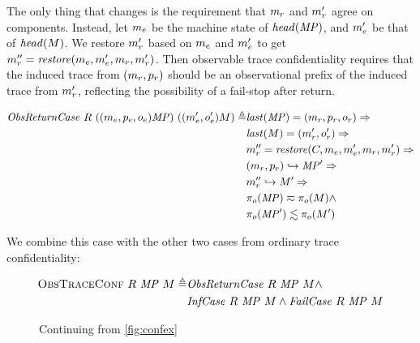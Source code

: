 \documentclass[acmsmall,review,anonymous]{acmart}\settopmatter{printfolios=true,printccs=false,printacmref=false}
\begin{document}
{{      The only thing that changes is the requirement that \(m_r\)
      and \(m_r'\) agree on components. Instead, let \(m_e\)
      be the machine state of \(\mathit{head}(\mathit{MP})\), and \(m_e'\) be
      that of \(\mathit{head}(M)\). We restore \(m_r'\) based on
      \(m_e\) and \(m_e'\) to get \(m_r'' =
      \mathit{restore}(m_e,m_e',m_r,m_r')\).  Then
      observable trace confidentiality requires that the
      induced trace from \((m_r,p_r)\) should be an
      observational prefix of the induced trace from \(m_r'\),
      reflecting the possibility of a fail-stop after return.

      \[\begin{split}
        \mathit{ObsReturnCase} ~ R ~ ((m_e,p_e,o_e)\mathit{MP}) ~ ((m_e',o_e')M) \triangleq
        & \mathit{last}(\mathit{MP}) = (m_r,p_r,o_r) \Rightarrow \\
        & \mathit{last}(M) = (m_r',o_r') \Rightarrow \\
        & m_r'' = \mathit{restore}(C,m_e,m_e',m_r,m_r') \Rightarrow\\
        & (m_r,p_r) \hookrightarrow \mathit{MP}' \Rightarrow \\
        & m_r'' \hookrightarrow M' \Rightarrow \\
        & \pi_o(\mathit{MP}) \eqsim \pi_o(M) \land \\
        & \pi_o(\mathit{MP}') \lesssim \pi_o(M') \\
      \end{split}\]

      We combine this case with the other two cases from ordinary trace
      confidentiality:

      \[\begin{split}
        \text{\sc ObsTraceConf} ~  R ~ \mathit{MP} ~ M \triangleq
        & \mathit{ObsReturnCase} ~ R ~ \mathit{MP} ~ M \land \\
        & \mathit{InfCase} ~ R ~ \mathit{MP} ~ M \land \mathit{FailCase} ~ R ~
          \mathit{MP} ~ M \\
      \end{split}\]

      \begin{figure}
        \confidentialitylazyexample
        \caption{Continuing from \cref{fig:confex}}
        \label{fig:conflex}
      \end{figure}

}}
\end{document}
